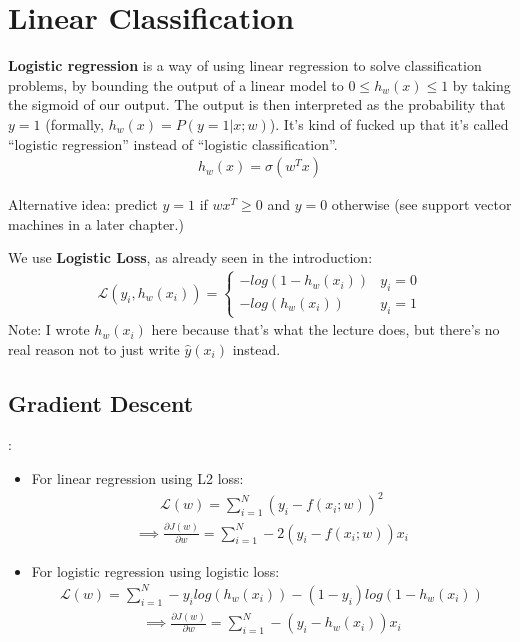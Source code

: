 \documentclass{report}
\newcommand{\tbf}{\textbf}
\newcommand{\pd}[2]{\frac{\partial #1}{\partial #2}}
\newcommand*{\newpar}{\par\vspace{\baselineskip}\noindent}
\newcommand{\loss}{\mathcal{L}}
\newcommand{\yhat}{\hat{y}}
\begin{document}
\section{Linear Classification}
\tbf{Logistic regression} is a way of using linear regression to solve classification problems, by bounding the output of a linear model to $0 \leq h_w(x) \leq 1$ by taking the sigmoid of our output. The output is then interpreted as the probability that $y = 1$ (formally, $h_w(x) = P(y = 1|x;w)$). It's kind of fucked up that it's called ``logistic regression'' instead of ``logistic classification''.
\begin{align}
 h_w(x) = \sigma(w^T x)
\end{align}

\newpar
Alternative idea: predict $y = 1$ if $w x^T \geq 0$ and $y = 0$ otherwise (see support vector machines in a later chapter.)
\newpar
We use \tbf{Logistic Loss}, as already seen in the introduction:
\begin{align}
 \loss(y_i,h_w(x_i)) =
 \begin{cases}
    -log(1-h_w(x_i)) & y_i = 0\\
    -log(h_w(x_i)) & y_i = 1
 \end{cases}
\end{align}
Note: I wrote $h_w(x_i)$ here because that's what the lecture does, but there's no real reason not to just write $\yhat(x_i)$ instead.
\subsection{Gradient Descent}:
\begin{itemize}
 \item For linear regression using L2 loss:
 \begin{align}
  \loss(w) = \sum_{i=1}^N (y_i - f(x_i; w))^2 
 \end{align}
 \begin{align}
  \implies \pd{J(w)}{w} = \sum_{i=1}^N -2(y_i - f(x_i;w))x_i
 \end{align}
 \item For logistic regression using logistic loss:
 \begin{align}
  \loss(w) = \sum_{i=1}^N -y_i log(h_w(x_i))-(1-y_i)log(1-h_w(x_i))
 \end{align}
 \begin{align}
  \implies \pd{J(w)}{w}  = \sum_{i=1}^N -(y_i - h_w(x_i))x_i
 \end{align}
\end{itemize}
\end{document}
